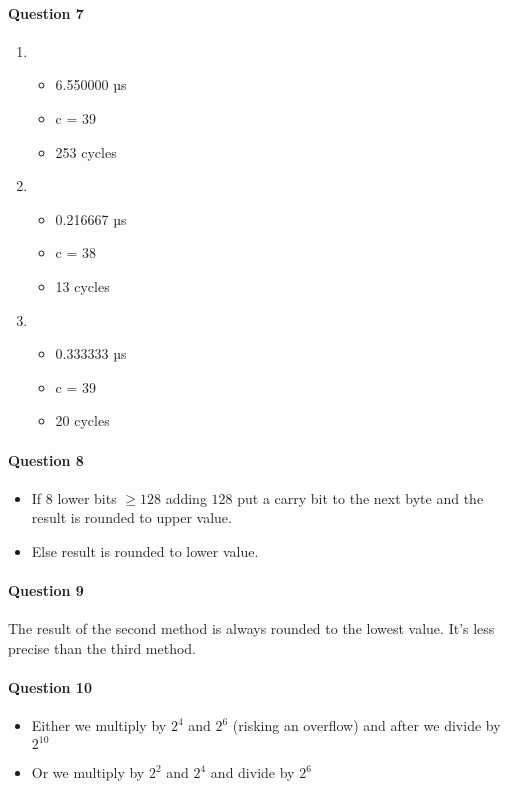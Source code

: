 \documentclass[10pt]{article}
\begin{document}
\paragraph{Question 7}
\begin{multicols}{3}
\begin{enumerate}
\item
	\begin{itemize}
	\item 6.550000 µs
	\item c = 39
	\item 253 cycles
	\end{itemize}

\item
	\begin{itemize}
	\item 0.216667 µs
	\item c = 38
	\item 13 cycles
	\end{itemize}

\item
	\begin{itemize}
	\item 0.333333 µs
	\item c = 39
	\item 20 cycles
	\end{itemize}
\end{enumerate}
\end{multicols}

\paragraph{Question 8}
\begin{itemize}
\item If $8$ lower bits $\geq 128$ adding $128$ put a carry bit to the next byte and the result is rounded to upper value.
\item Else result is rounded to lower value.
\end{itemize}

\paragraph{Question 9}
The result of the second method is always rounded to the lowest value. It's less precise than the third method.

\paragraph{Question 10}
\begin{itemize}
\item Either we multiply by $2^4$ and $2^6$ (risking an overflow) and after we divide by $2^10$
\item Or we multiply by $2^2$ and $2^4$ and divide by $2^6$
\end{itemize}
\end{document}
